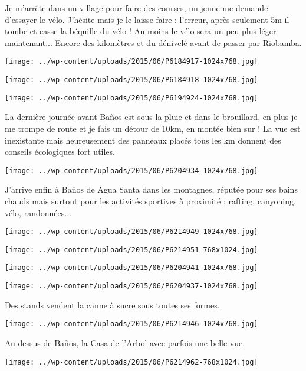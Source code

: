 Je m'arrête dans un village pour faire des courses, un jeune me demande d'essayer le vélo. J'hésite mais je le laisse faire : l'erreur, après seulement 5m il tombe et casse la béquille du vélo ! Au moins le vélo sera un peu plus léger maintenant...
Encore des kilomètres et du dénivelé avant de passer par Riobamba. 
\begin{center} \texttt{[image: ../wp-content/uploads/2015/06/P6184917-1024x768.jpg]} \end{center}
\begin{center} \texttt{[image: ../wp-content/uploads/2015/06/P6184918-1024x768.jpg]} \end{center}
\begin{center} \texttt{[image: ../wp-content/uploads/2015/06/P6194924-1024x768.jpg]} \end{center}
\pagebreak

La dernière journée avant Baños est sous la pluie et dans le brouillard, en plus je me trompe de route et je fais un détour de 10km, en montée bien sur ! La vue est inexistante mais heureusement des panneaux placés tous les km donnent des conseils écologiques fort utiles. 

\begin{center} \texttt{[image: ../wp-content/uploads/2015/06/P6204934-1024x768.jpg]} \end{center}

J'arrive enfin à Baños de Agua Santa dans les montagnes, réputée pour ses bains chauds mais surtout pour les activités sportives à proximité : rafting, canyoning, vélo, randonnées... 
\begin{center} \texttt{[image: ../wp-content/uploads/2015/06/P6214949-1024x768.jpg]} \end{center}
\begin{center} \texttt{[image: ../wp-content/uploads/2015/06/P6214951-768x1024.jpg]} \end{center}
\begin{center} \texttt{[image: ../wp-content/uploads/2015/06/P6204941-1024x768.jpg]} \end{center}
\begin{center} \texttt{[image: ../wp-content/uploads/2015/06/P6204937-1024x768.jpg]} \end{center}

Des stands vendent la canne à sucre sous toutes ses formes. 
\begin{center} \texttt{[image: ../wp-content/uploads/2015/06/P6214946-1024x768.jpg]} \end{center}
\pagebreak

Au dessus de Baños, la Casa de l'Arbol avec parfois une belle vue. 
\begin{center} \texttt{[image: ../wp-content/uploads/2015/06/P6214962-768x1024.jpg]} \end{center}

